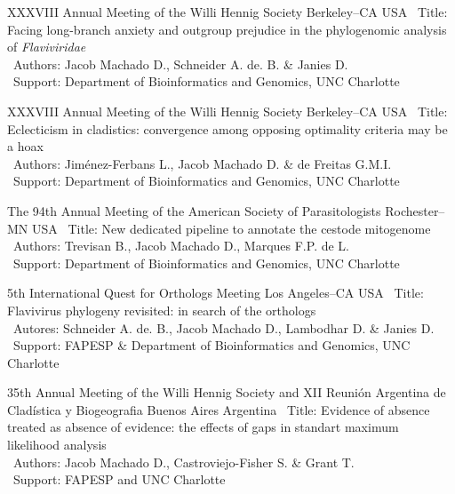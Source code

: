 \documentclass[11pt, letterpaper, sans]{moderncv}
\begin{document}
	{XXXVIII Annual Meeting of the Willi Hennig Society}
	{Berkeley--CA}
	{USA}
	{}
	{
		\textbullet~Title: Facing long-branch anxiety and outgroup prejudice in the phylogenomic analysis of \emph{Flaviviridae}\\
		\textbullet~Authors: Jacob Machado D., Schneider A. de. B. \& Janies D.\\
		\textbullet~Support: Department of Bioinformatics and Genomics,  UNC Charlotte
	}

\vspace{.5em}

\cventry{---}
	{XXXVIII Annual Meeting of the Willi Hennig Society}
	{Berkeley--CA}
	{USA}
	{}
	{
		\textbullet~Title: Eclecticism in cladistics: convergence among opposing optimality criteria may be a hoax\\
		\textbullet~Authors: Jiménez-Ferbans L., Jacob Machado D. \& de Freitas G.M.I.\\ \textbullet~Support: Department of Bioinformatics and Genomics,  UNC Charlotte
	}

\vspace{.5em}

\cventry{---}
	{The 94th Annual Meeting of the American Society of Parasitologists}
	{Rochester--MN}
	{USA}
	{}
	{
		\textbullet~Title:  New dedicated pipeline to annotate the cestode mitogenome\\
		\textbullet~Authors: Trevisan B., Jacob Machado D., Marques F.P. de L.\\ \textbullet~Support: Department of Bioinformatics and Genomics,  UNC Charlotte
	}

\vspace{.5em}

	{5th International Quest for Orthologs Meeting}
	{Los Angeles--CA}
	{USA}
	{}
	{
		\textbullet~Title: Flavivirus phylogeny revisited: in search of the orthologs\\
		\textbullet~Autores: Schneider A. de. B., Jacob Machado D., Lambodhar D. \& Janies D.\\
		\textbullet~Support: FAPESP \& Department of Bioinformatics and Genomics,  UNC Charlotte
	}

\vspace{.5em}

	{35th Annual Meeting of the Willi Hennig Society and XII Reunión Argentina de Cladística y Biogeografia}
	{Buenos Aires}
	{Argentina}
	{}
	{
		\textbullet~Title: Evidence of absence treated as absence of evidence: the effects of gaps in standart maximum likelihood analysis\\
		\textbullet~Authors: Jacob Machado D., Castroviejo-Fisher S. \& Grant T.\\
		\textbullet~Support: FAPESP and UNC Charlotte
	}
\end{document}
